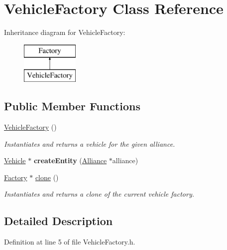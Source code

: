 \hypertarget{classVehicleFactory}{}\section{Vehicle\+Factory Class Reference}
\label{classVehicleFactory}
Inheritance diagram for Vehicle\+Factory\+:\begin{figure}[H]
\begin{center}
\leavevmode
\includegraphics[height=2.000000cm]{classVehicleFactory}
\end{center}
\end{figure}
\subsection*{Public Member Functions}
\begin{DoxyCompactItemize}
\item 
\hyperlink{classVehicleFactory_ad20e739afc40f61315fb842773df8498}{Vehicle\+Factory} ()
\begin{DoxyCompactList}\small\item\em Instantiates and returns a vehicle for the given alliance. \end{DoxyCompactList}\item 
\mbox{\label{classVehicleFactory_a36324223b0cd4ee93bb92249cfc639f0}} 
\hyperlink{classVehicle}{Vehicle} $\ast$ {\bfseries create\+Entity} (\hyperlink{classAlliance}{Alliance} $\ast$alliance)
\item 
\hyperlink{classFactory}{Factory} $\ast$ \hyperlink{classVehicleFactory_a6d874e37b573b491a49e303209ac42cd}{clone} ()
\begin{DoxyCompactList}\small\item\em Instantiates and returns a clone of the current vehicle factory. \end{DoxyCompactList}\end{DoxyCompactItemize}


\subsection{Detailed Description}


Definition at line 5 of file Vehicle\+Factory.\+h.



